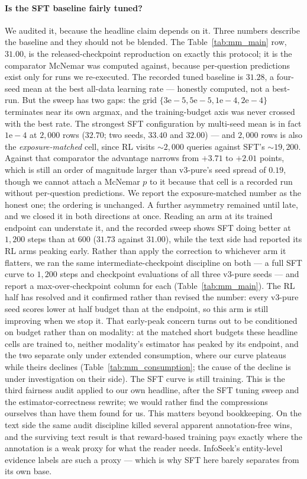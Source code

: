 \paragraph{Is the SFT baseline fairly tuned?} We audited it, because the headline claim depends
on it. Three numbers describe the baseline and they should not be blended. The Table~\ref{tab:mm_main}
row, $31.00$, is the released-checkpoint reproduction on exactly this protocol; it is the
comparator McNemar was computed against, because per-question predictions exist only for runs we
re-executed. The recorded tuned baseline is $31.28$, a four-seed mean at the best all-data
learning rate --- honestly computed, not a best-run. But the sweep has two gaps: the grid
$\{3\mathrm{e}{-}5, 5\mathrm{e}{-}5, 1\mathrm{e}{-}4, 2\mathrm{e}{-}4\}$ terminates near its own
argmax, and the training-budget axis was never crossed with the best rate. The strongest SFT
configuration by multi-seed mean is in fact $1\mathrm{e}{-}4$ at $2{,}000$ rows
($32.70$; two seeds, $33.40$ and $32.00$) --- and $2{,}000$ rows is also the
\emph{exposure-matched} cell, since RL visits ${\sim}2{,}000$ queries against SFT's
${\sim}19{,}200$. Against that comparator the advantage narrows from $+3.71$ to $+2.01$ points,
which is still an order of magnitude larger than v3-pure's seed spread of $0.19$, though we
cannot attach a McNemar $p$ to it because that cell is a recorded run without per-question
predictions. We report the exposure-matched number as the honest one; the ordering is unchanged.
A further asymmetry remained until late, and we closed it in both directions at once. Reading an
arm at its trained endpoint can understate it, and the recorded sweep shows SFT doing better at
$1{,}200$ steps than at $600$ ($31.73$ against $31.00$), while the text side had reported its RL
arms peaking early. Rather than apply the correction to whichever arm it flatters, we ran the same
intermediate-checkpoint discipline on both --- a full SFT curve to $1{,}200$ steps and
checkpoint evaluations of all three v3-pure seeds --- and report a max-over-checkpoint column for
each (Table~\ref{tab:mm_main}). The RL half has resolved and it confirmed rather than revised the
number: every v3-pure seed scores lower at half budget than at the endpoint, so this arm is still
improving when we stop it. That early-peak concern turns out to be conditioned on budget rather
than on modality: at the matched short budgets these headline cells are trained to, neither
modality's estimator has peaked by its endpoint, and the two separate only under extended
consumption, where our curve plateaus while theirs declines
(Table~\ref{tab:mm_consumption}; the cause of the decline is under investigation on their side).
The SFT curve is still training. This is the third fairness audit applied to our own headline,
after the SFT tuning sweep and the estimator-correctness rewrite; we would rather find the
compressions ourselves than have them found for us.
This matters beyond bookkeeping. On the text side the same audit discipline killed several
apparent annotation-free wins, and the surviving text result is that reward-based training pays
exactly where the annotation is a weak proxy for what the reader needs. InfoSeek's entity-level
evidence labels are such a proxy --- which is why SFT here barely separates from its own base.

